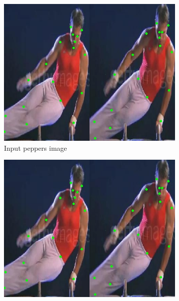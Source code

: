 \documentclass[conference]{IEEEtran}
\begin{document}
\begin{figure}[htbp]{}
\centering
\begin{subfigure}[t]{2cm}
\includegraphics[width=\linewidth, height=1.2\linewidth]{dm1} 
\caption{Input peppers image}
\label{cari1}
\end{subfigure}
\hfill %
\begin{subfigure}[t]{2cm}
\includegraphics[width=\linewidth, height=1.2\linewidth]{dm1}

\end{subfigure}
\end{figure}
\end{document}
